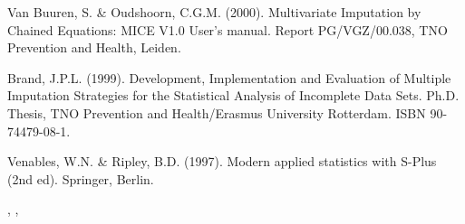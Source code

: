 \documentclass{article}
\begin{document}
\begin{References}\relax
Van Buuren, S. \& Oudshoorn, C.G.M. (2000). Multivariate Imputation by Chained Equations: 
MICE V1.0 User's manual. Report PG/VGZ/00.038, TNO Prevention and Health, Leiden.

Brand, J.P.L. (1999). Development, Implementation and Evaluation
of Multiple
Imputation Strategies for the Statistical Analysis of Incomplete
Data Sets.
Ph.D. Thesis, TNO Prevention and Health/Erasmus University Rotterdam. ISBN 90-74479-08-1. 

Venables, W.N. \& Ripley, B.D. (1997). Modern applied statistics with S-Plus (2nd ed). Springer, Berlin.
\end{References}
\begin{SeeAlso}\relax
{}, , 
\end{SeeAlso}
\end{document}
